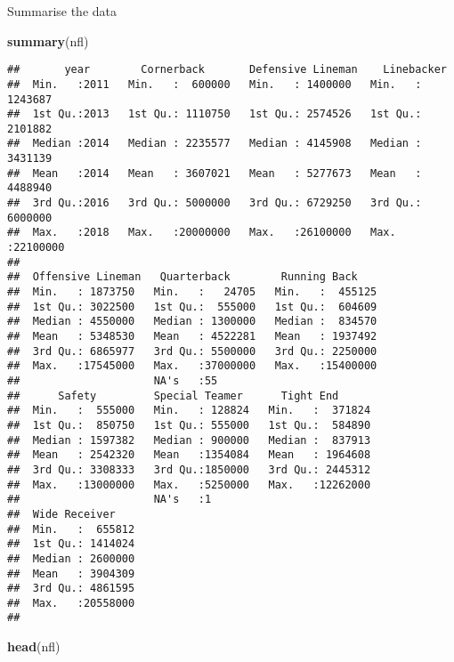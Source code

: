 \documentclass[]{article}
\newenvironment{Shaded}{\begin{snugshade}}{\end{snugshade}}
\newcommand{\KeywordTok}[1]{\textcolor[rgb]{0.13,0.29,0.53}{\textbf{#1}}}
\newcommand{\NormalTok}[1]{#1}
\begin{document}
Summarise the data

\begin{Shaded}
\begin{Highlighting}[]
\KeywordTok{summary}\NormalTok{(nfl)}
\end{Highlighting}
\end{Shaded}

\begin{verbatim}
##       year        Cornerback       Defensive Lineman    Linebacker      
##  Min.   :2011   Min.   :  600000   Min.   : 1400000   Min.   : 1243687  
##  1st Qu.:2013   1st Qu.: 1110750   1st Qu.: 2574526   1st Qu.: 2101882  
##  Median :2014   Median : 2235577   Median : 4145908   Median : 3431139  
##  Mean   :2014   Mean   : 3607021   Mean   : 5277673   Mean   : 4488940  
##  3rd Qu.:2016   3rd Qu.: 5000000   3rd Qu.: 6729250   3rd Qu.: 6000000  
##  Max.   :2018   Max.   :20000000   Max.   :26100000   Max.   :22100000  
##                                                                         
##  Offensive Lineman   Quarterback        Running Back     
##  Min.   : 1873750   Min.   :   24705   Min.   :  455125  
##  1st Qu.: 3022500   1st Qu.:  555000   1st Qu.:  604609  
##  Median : 4550000   Median : 1300000   Median :  834570  
##  Mean   : 5348530   Mean   : 4522281   Mean   : 1937492  
##  3rd Qu.: 6865977   3rd Qu.: 5500000   3rd Qu.: 2250000  
##  Max.   :17545000   Max.   :37000000   Max.   :15400000  
##                     NA's   :55                           
##      Safety         Special Teamer      Tight End       
##  Min.   :  555000   Min.   : 128824   Min.   :  371824  
##  1st Qu.:  850750   1st Qu.: 555000   1st Qu.:  584890  
##  Median : 1597382   Median : 900000   Median :  837913  
##  Mean   : 2542320   Mean   :1354084   Mean   : 1964608  
##  3rd Qu.: 3308333   3rd Qu.:1850000   3rd Qu.: 2445312  
##  Max.   :13000000   Max.   :5250000   Max.   :12262000  
##                     NA's   :1                           
##  Wide Receiver     
##  Min.   :  655812  
##  1st Qu.: 1414024  
##  Median : 2600000  
##  Mean   : 3904309  
##  3rd Qu.: 4861595  
##  Max.   :20558000  
## 
\end{verbatim}

\begin{Shaded}
\begin{Highlighting}[]
\KeywordTok{head}\NormalTok{(nfl)}
\end{Highlighting}
\end{Shaded}
\end{document}
